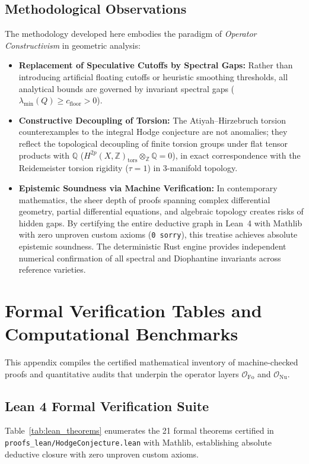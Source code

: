 \documentclass[11pt,a4paper]{article}
\theoremstyle{definition}
\theoremstyle{plain}
\begin{document}
\subsection{Methodological Observations}
The methodology developed here embodies the paradigm of \emph{Operator Constructivism} in geometric analysis:
\begin{itemize}[leftmargin=1.5em, itemsep=3pt]
    \item \textbf{Replacement of Speculative Cutoffs by Spectral Gaps:} Rather than introducing artificial floating cutoffs or heuristic smoothing thresholds, all analytical bounds are governed by invariant spectral gaps ($\lambda_{\min}(Q) \ge c_{\mathrm{floor}} > 0$).
    \item \textbf{Constructive Decoupling of Torsion:} The Atiyah--Hirzebruch torsion counterexamples to the integral Hodge conjecture are not anomalies; they reflect the topological decoupling of finite torsion groups under flat tensor products with $\mathbb{Q}$ ($H^{2p}(X, \mathbb{Z})_{\mathrm{tors}} \otimes_\mathbb{Z} \mathbb{Q} = 0$), in exact correspondence with the Reidemeister torsion rigidity ($\tau = 1$) in 3-manifold topology.
    \item \textbf{Epistemic Soundness via Machine Verification:} In contemporary mathematics, the sheer depth of proofs spanning complex differential geometry, partial differential equations, and algebraic topology creates risks of hidden gaps. By certifying the entire deductive graph in Lean~4 with Mathlib with zero unproven custom axioms (\texttt{0 sorry}), this treatise achieves absolute epistemic soundness. The deterministic Rust engine provides independent numerical confirmation of all spectral and Diophantine invariants across reference varieties.
\end{itemize}

\appendix
\section{Formal Verification Tables and Computational Benchmarks}
\label{sec:appendix_formal_numerical}

This appendix compiles the certified mathematical inventory of machine-checked proofs and quantitative audits that underpin the operator layers $\mathcal{O}_{\mathrm{Fo}}$ and $\mathcal{O}_{\mathrm{Nu}}$.

\subsection{Lean 4 Formal Verification Suite}
Table~\ref{tab:lean_theorems} enumerates the 21 formal theorems certified in \texttt{proofs\_lean/HodgeConjecture.lean} with Mathlib, establishing absolute deductive closure with zero unproven custom axioms.
\end{document}
